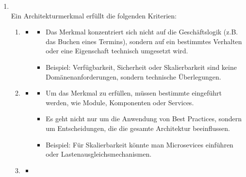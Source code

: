 \begin{infoBox}
    \begin{enumerate}
        \item {}\\
        Ein Architekturmerkmal erfüllt die folgenden Kriterien:
        \begin{enumerate}
            \item {}
            \begin{itemize}
                \item {}
                \begin{itemize}
                    \item Das Merkmal konzentriert sich nicht auf die Geschäftslogik (z.B. das Buchen eines Termins), sondern auf  ein bestimmtes Verhalten oder eine Eigenschaft technisch umgesetzt wird.
                    \item Beispiel: Verfügbarkeit, Sicherheit oder Skalierbarkeit sind keine Domänenanforderungen, sondern technische Überlegungen.
                \end{itemize}
            \end{itemize}
            \item {}
            \begin{itemize}
                \item {}
                \begin{itemize}
                    \item Um das Merkmal zu erfüllen, müssen bestimmte  eingeführt werden, wie Module, Komponenten oder Services.
                    \item Es geht nicht nur um die Anwendung von Best Practices, sondern um Entscheidungen, die die gesamte Architektur beeinflussen.
                    \item Beispiel: Für Skalierbarkeit könnte man Microsevices einführen oder Lastenausgleichsmechanismen.
                \end{itemize}
            \end{itemize}
            \item {}
            \begin{itemize}
                \item {}

\end{itemize}
\end{enumerate}
\end{enumerate}
\end{infoBox}

